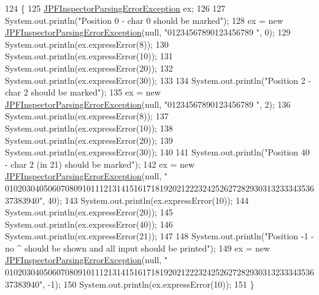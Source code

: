 \begin{DoxyCode}
124                                           \{
125     \hyperlink{classgov_1_1nasa_1_1jpf_1_1inspector_1_1exceptions_1_1_j_p_f_inspector_parsing_error_exception_a1292934c23ecc0e668a0938d022c8bb4}{JPFInspectorParsingErrorException} ex;
126 
127     System.out.println(\textcolor{stringliteral}{"Position 0 - char 0 should be marked"});
128     ex = \textcolor{keyword}{new} \hyperlink{classgov_1_1nasa_1_1jpf_1_1inspector_1_1exceptions_1_1_j_p_f_inspector_parsing_error_exception_a1292934c23ecc0e668a0938d022c8bb4}{JPFInspectorParsingErrorException}(null, \textcolor{stringliteral}{"01234567890123456789
      "}, 0);
129     System.out.println(ex.expressError(8));
130     System.out.println(ex.expressError(10));
131     System.out.println(ex.expressError(20));
132     System.out.println(ex.expressError(30));
133 
134     System.out.println(\textcolor{stringliteral}{"Position 2 - char 2 should be marked"});
135     ex = \textcolor{keyword}{new} \hyperlink{classgov_1_1nasa_1_1jpf_1_1inspector_1_1exceptions_1_1_j_p_f_inspector_parsing_error_exception_a1292934c23ecc0e668a0938d022c8bb4}{JPFInspectorParsingErrorException}(null, \textcolor{stringliteral}{"01234567890123456789
      "}, 2);
136     System.out.println(ex.expressError(8));
137     System.out.println(ex.expressError(10));
138     System.out.println(ex.expressError(20));
139     System.out.println(ex.expressError(30));
140 
141     System.out.println(\textcolor{stringliteral}{"Position 40 - char 2 (in 21) should be marked"});
142     ex = \textcolor{keyword}{new} \hyperlink{classgov_1_1nasa_1_1jpf_1_1inspector_1_1exceptions_1_1_j_p_f_inspector_parsing_error_exception_a1292934c23ecc0e668a0938d022c8bb4}{JPFInspectorParsingErrorException}(null, \textcolor{stringliteral}{"
      01020304050607080910111213141516171819202122232425262728293031323334353637383940"}, 40);
143     System.out.println(ex.expressError(10));
144     System.out.println(ex.expressError(20));
145     System.out.println(ex.expressError(40));
146     System.out.println(ex.expressError(21));
147 
148     System.out.println(\textcolor{stringliteral}{"Position -1 - no ^ should be shown and all input should be printed"});
149     ex = \textcolor{keyword}{new} \hyperlink{classgov_1_1nasa_1_1jpf_1_1inspector_1_1exceptions_1_1_j_p_f_inspector_parsing_error_exception_a1292934c23ecc0e668a0938d022c8bb4}{JPFInspectorParsingErrorException}(null, \textcolor{stringliteral}{"
      01020304050607080910111213141516171819202122232425262728293031323334353637383940"}, -1);
150     System.out.println(ex.expressError(10));
151   \}
\end{DoxyCode}


